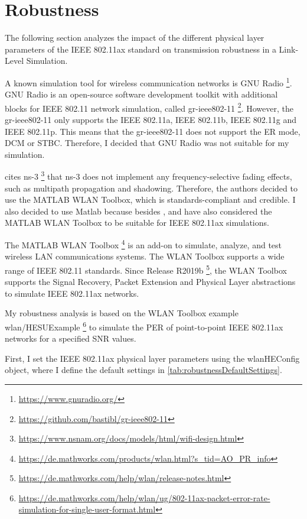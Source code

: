 \section{Robustness}
\label{sec:Robustness}
The following section analyzes the impact of the different physical layer parameters of the IEEE 802.11ax standard on transmission robustness in a
Link-Level Simulation.

A known simulation tool for wireless communication networks is GNU Radio \footnote{\url{https://www.gnuradio.org/}}.
GNU Radio is an open-source software development toolkit with additional blocks for IEEE 802.11 network simulation,
called gr-ieee802-11 \footnote{\url{https://github.com/bastibl/gr-ieee802-11}}.
However, the gr-ieee802-11 only supports the IEEE 802.11a, IEEE 802.11b, IEEE 802.11g and IEEE 802.11p.
This means that the gr-ieee802-11 does not support the \ac{ER} mode, \ac{DCM} or \ac{STBC}.
Therefore, I decided that GNU Radio was not suitable for my simulation.

\textcite{s_performance_2022} cites ns-3 \footnote{\url{https://www.nsnam.org/docs/models/html/wifi-design.html}}
that ns-3 does not implement
any frequency-selective fading effects, such as multipath propagation and shadowing.
Therefore, the authors decided to use the MATLAB WLAN Toolbox, which is standards-compliant and credible.
I also decided to use Matlab because besides \cite{s_performance_2022}, \cite{cao_efficient_2022} and
\cite{jin_efficient_2021} have also considered
the MATLAB WLAN Toolbox to be suitable for IEEE 802.11ax simulations.

The MATLAB WLAN Toolbox \footnote{\url{https://de.mathworks.com/products/wlan.html?s_tid=AO_PR_info}} is an add-on to simulate, analyze, and test wireless LAN communications systems.
The WLAN Toolbox supports a wide range of IEEE 802.11 standards.
Since Release R2019b \footnote{\url{https://de.mathworks.com/help/wlan/release-notes.html}}, the WLAN Toolbox supports the Signal Recovery, Packet Extension and Physical Layer abstractions to simulate IEEE 802.11ax networks.

My robustness analysis is based on the WLAN Toolbox example wlan/HESUExample \footnote{\url{https://de.mathworks.com/help/wlan/ug/802-11ax-packet-error-rate-simulation-for-single-user-format.html}} to simulate the \ac{PER} of point-to-point IEEE 802.11ax networks for
a specified \ac{SNR} values.

First, I set the IEEE 802.11ax physical layer parameters using the wlanHEConfig object,
where I define the default settings in \autoref{tab:robustnessDefaultSettings}.

